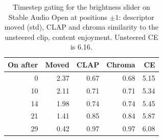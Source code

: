 \begin{table}[t]\centering\small\setlength{\tabcolsep}{4pt}
\begin{tabular}{rrrrr}
\toprule
On after & Moved & CLAP & Chroma & CE \\
\midrule
0 & 2.37 & 0.67 & 0.68 & 5.15 \\
10 & 2.11 & 0.71 & 0.71 & 5.34 \\
14 & 1.98 & 0.74 & 0.74 & 5.45 \\
21 & 1.41 & 0.85 & 0.84 & 5.87 \\
29 & 0.42 & 0.97 & 0.97 & 6.08 \\
\bottomrule
\end{tabular}
\caption{Timestep gating for the brightness slider on Stable Audio Open at positions $\pm1$: descriptor moved (std), CLAP and chroma similarity to the unsteered clip, content enjoyment. Unsteered CE is 6.16.}\label{tab:gating}
\end{table}
